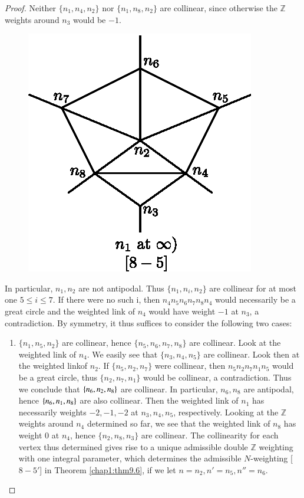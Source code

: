 \begin{proof}
Neither $\{ n_1, n_4, n_2 \}$ nor $\{ n_1, n_8, n_2 \}$ are collinear,
since otherwise the $\mathbb{Z}$ weights around $n_3$ would be
$-1$. 
\begin{figure}[H]
\centering 
\includegraphics[scale=0.8]{vol58-fig/fig58-49.eps} 
\end{figure}

In particular, $n_1, n_2$ are not antipodal. Thus $\{ n_1, n_i,
n_2 \}$ are collinear for at most one $5 \le i \le 7$. If there were
no such i, then $n_4n_5n_6n_7n_8n_4$ would necessarily be a great
circle and the weighted link of $n_4$ would have weight $-1$ at $n_3$,
a contradiction. By symmetry, it thus suffices to consider the 
following two cases: 
\begin{enumerate}
\item $\{ n_1, n_5, n_2 \}$ are collinear, hence $\{ n_5, n_6, n_7,
  n_8 \}$ are collinear. Look at the weighted link of $n_4$. We easily
  see that $\{ n_3, n_4, n_5 \}$ are collinear. Look then at the
  weighted link\pageoriginale of $n_2$. If $\{ n_5, n_2, n_7 \}$ were
  collinear, then 
  $n_5n_2n_7n_1n_5$ would be a great circle, thus $\{ n_2, n_7, n_1
  \}$ would be collinear, a contradiction. Thus we conclude that $\{
  n_6, n_2,\break n_8 \}$ are collinear. In particular, $n_6 , n_8$ are
  antipodal, hence $\{ n_6, n_1,\break n_8 \}$ are also collinear.  Then the
  weighted link of $n_1$ has necessarily weights $-2, -1, -2$ at $
  n_3, n_4, n_5 $, respectively.   Looking at the $\mathbb{Z}$
  weights around $n_4$ determined so far,  we see that the weighted
  link of $n_8$ has weight 0 at $n_4$, hence $\{ n_2, n_8, n_3 \}$
  are collinear.  The collinearity for each vertex thus determined
  gives rise to a unique admissible double $\mathbb{Z}$ weighting with
  one integral parameter, which determines the admissible
  $N$-weighting [$8-5'$] in Theorem \ref{chap1:thm9.6},  if we let  $n = n_2, n' =
  n_5  , n'' = n_6$. 


\end{enumerate}
\end{proof}
